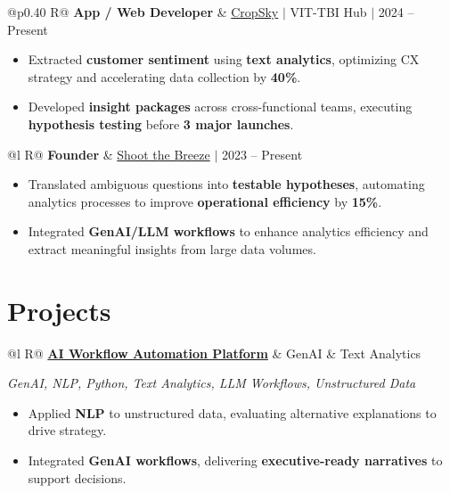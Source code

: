 \documentclass[a4paper,10pt]{article}
\newcommand{\ulink}[2]{\href{#1}{#2}}
\newcommand{\subheading}[1]{{\color[HTML]{0A0A0A}\fontsize{12}{14}\selectfont\bfseries #1}}
\newcommand{\techstack}[1]{{\color[HTML]{5C5C5C}\fontsize{10.5}{12.5}\selectfont\itshape #1}}
\newcommand{\meta}[1]{{\color[HTML]{5C5C5C}\fontsize{10.5}{12.5}\selectfont #1}}
\begin{document}
\begin{tabularx}{\linewidth}{@{}p{0.40\linewidth} R@{}}
\subheading{App / Web Developer} & \meta{\ulink{https://sites.google.com/view/cropsky/home}{CropSky} $|$ VIT-TBI Hub $|$ 2024 -- Present}
\end{tabularx}
\begin{itemize}[nosep, leftmargin=1.5em, itemsep=2pt, topsep=2pt]
  \item {\color[HTML]{0A0A0A}\fontsize{11}{14}\selectfont Extracted \textbf{customer sentiment} using \textbf{text analytics}, optimizing CX strategy and accelerating data collection by \textbf{40\%}.}
  \item {\color[HTML]{0A0A0A}\fontsize{11}{14}\selectfont Developed \textbf{insight packages} across cross-functional teams, executing \textbf{hypothesis testing} before \textbf{3 major launches}.}
\end{itemize}

\begin{tabularx}{\linewidth}{@{}l R@{}}
\subheading{Founder} & \meta{\ulink{https://shoot-the-breeze.vercel.app}{Shoot the Breeze} $|$ 2023 -- Present}
\end{tabularx}
\begin{itemize}[nosep, leftmargin=1.5em, itemsep=2pt, topsep=2pt]
  \item {\color[HTML]{0A0A0A}\fontsize{11}{14}\selectfont Translated ambiguous questions into \textbf{testable hypotheses}, automating analytics processes to improve \textbf{operational efficiency} by \textbf{15\%}.}
  \item {\color[HTML]{0A0A0A}\fontsize{11}{14}\selectfont Integrated \textbf{GenAI/LLM workflows} to enhance analytics efficiency and extract meaningful insights from large data volumes.}
\end{itemize}

\section{Projects}
\vspace{2pt}

\begin{tabularx}{\linewidth}{@{}l R@{}}
\subheading{\ulink{https://github.com/su-jin1425/AI-Workflow-Automation-Platform}{AI Workflow Automation Platform}} & \meta{GenAI \& Text Analytics}
\end{tabularx}
\techstack{GenAI, NLP, Python, Text Analytics, LLM Workflows, Unstructured Data}
\begin{itemize}[nosep, leftmargin=1.5em, itemsep=2pt, topsep=2pt]
  \item {\color[HTML]{0A0A0A}\fontsize{11}{14}\selectfont Applied \textbf{NLP} to unstructured data, evaluating alternative explanations to drive strategy.}
  \item {\color[HTML]{0A0A0A}\fontsize{11}{14}\selectfont Integrated \textbf{GenAI workflows}, delivering \textbf{executive-ready narratives} to support decisions.}
\end{itemize}
\end{document}
